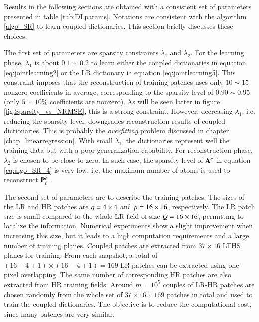 Results in the following sections are obtained with a consistent set of parameters presented in table \ref{tab:DLparams}. Notations are consistent with the algorithm \ref{algo_SR} to learn coupled dictionaries. This section briefly discusses these choices.

The first set of parameters are sparsity constraints $ \lambda_1 $ and $ \lambda_2 $. For the learning phase, $ \lambda_1 $ is about $ 0.1 \sim 0.2 $ to learn either the coupled dictionaries in equation \ref{eq:jointlearning2} or the LR dictionary in equation \ref{eq:jointlearning5}. This constraint imposes that the reconstruction of training patches uses only $ 10\sim15 $ nonzero coefficients in average, corresponding to the sparsity level of $ 0.90\sim0.95 $ (only $ 5 \sim 10\% $ coefficients are nonzero). As will be seen latter in figure \ref{fig:Sparsity_vs_NRMSE}, this is a strong constraint. However, decreasing $ \lambda_1 $, i.e. reducing the sparsity level, downgrades reconstruction results of coupled dictionaries. This is probably the \textit{overfitting} problem discussed in chapter \ref{chap_linearregression}. With small $ \lambda_1 $, the dictionaries represent well the training data but with a poor generalization capability. For reconstruction phase, $ \lambda_2 $ is chosen to be close to zero. In such case, the sparsity level of $ \mathbf{A}^{e} $ in equation \ref{eq:algo_SR_4} is very low, i.e. the maximum number of atoms is used to reconstruct $ \mathbf{P}^{e}_\ell $.

The second set of parameters are to describe the training patches. The sizes of the LR and HR patches are $ q = 4 \times 4 $ and $ p = 16 \times 16 $, respectively. The LR patch size is small compared to the whole LR field of size $ Q = 16 \times 16 $, permitting to localize the information. Numerical experiments show a slight improvement when increasing this size, but it leads to a high computation requirements and a large number of training planes. Coupled patches are extracted from $ 37 \times 16 $ LTHS planes for training. From each snapshot, a total of $ (16-4+1) \times (16-4+1) =169$ LR patches can be extracted using one-pixel overlapping. The same number of corresponding HR patches are also extracted from HR training fields. Around $ m=10^5 $ couples of LR-HR patches are chosen randomly from the whole set of $ 37 \times 16 \times 169 $ patches in total and used to train the coupled dictionaries. The objective is to reduce the computational cost, since many patches are very similar. 

